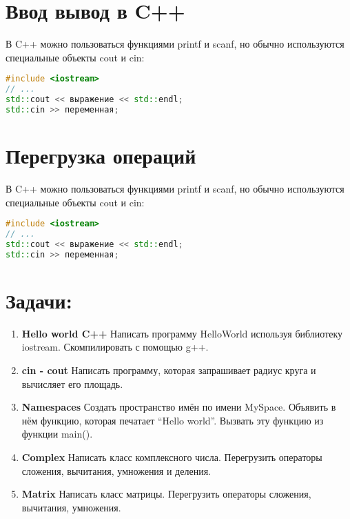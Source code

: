 \documentclass{article}
\begin{document}
\section{Ввод вывод в C++}
В C++ можно пользоваться функциями printf и scanf, но обычно используются специальные объекты cout и cin:
\begin{lstlisting}[language=C++,basicstyle=\ttfamily,keywordstyle=\color{blue}]
#include <iostream>
// ...
std::cout << выражение << std::endl;
std::cin >> переменная;
\end{lstlisting}

\section{Перегрузка операций}
В C++ можно пользоваться функциями printf и scanf, но обычно используются специальные объекты cout и cin:
\begin{lstlisting}[language=C++,basicstyle=\ttfamily,keywordstyle=\color{blue}]
#include <iostream>
// ...
std::cout << выражение << std::endl;
std::cin >> переменная;
\end{lstlisting}




\section*{Задачи:}
\begin{enumerate}
\item \textbf{Hello world C++} Написать программу HelloWorld используя библиотеку iostream. Скомпилировать с помощью g++.
\item \textbf{cin - cout} Написать программу, которая запрашивает радиус круга и вычисляет его площадь.
\item \textbf{Namespaces} Создать пространство имён по имени MySpace. Объявить в нём функцию, которая печатает ``Hello world''. Вызвать эту функцию из функции main().
\item \textbf{Complex} Написать класс комплексного числа. Перегрузить операторы сложения, вычитания, умножения и деления.
\item \textbf{Matrix} Написать класс матрицы. Перегрузить операторы сложения, вычитания, умножения.
\end{enumerate}
\end{document}
